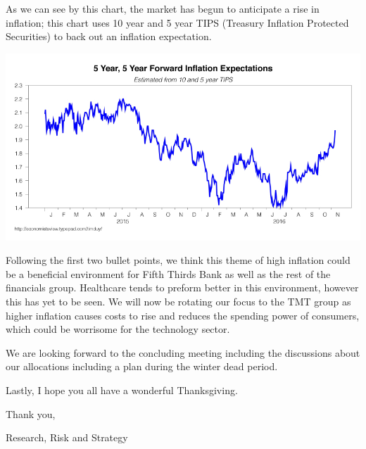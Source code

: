 \documentclass[11pt,pressrelease]{newlfm} %
\begin{document}
\begin{newlfm}
\begin{singlespace}
\begin{enumerate}
\newpage
As we can see by this chart, the market has begun to anticipate a rise in inflation; this chart uses 10 year and 5 year TIPS (Treasury Inflation Protected Securities) to back out an inflation expectation.
\begin{center}
\includegraphics[width=.8\textwidth]{5_year_inflation.jpg}
\end{center}

Following the first two bullet points, we think this theme of high inflation could be a beneficial environment for Fifth Thirds Bank as well as the rest of the financials group. Healthcare tends to preform better in this environment, however this has yet to be seen. We will now be rotating our focus to the TMT group as higher inflation causes costs to rise and reduces the spending power of consumers, which could be worrisome for the technology sector.


\end{enumerate}
\par

We are looking forward to the concluding meeting including the discussions about our allocations including a plan during the winter dead period. \par Lastly, I hope you all have a wonderful Thanksgiving.

\vspace{2.5in}
Thank you, \par
Research, Risk and Strategy


\end{singlespace} %



\end{newlfm}
\end{document}
